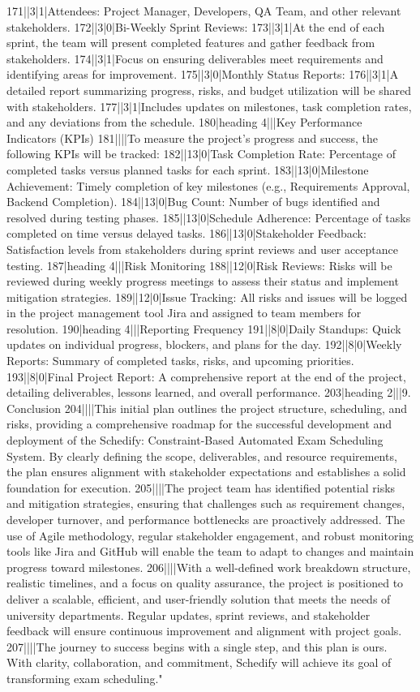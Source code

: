 171||3|1|Attendees: Project Manager, Developers, QA Team, and other relevant stakeholders.
172||3|0|Bi-Weekly Sprint Reviews:
173||3|1|At the end of each sprint, the team will present completed features and gather feedback from stakeholders.
174||3|1|Focus on ensuring deliverables meet requirements and identifying areas for improvement.
175||3|0|Monthly Status Reports:
176||3|1|A detailed report summarizing progress, risks, and budget utilization will be shared with stakeholders.
177||3|1|Includes updates on milestones, task completion rates, and any deviations from the schedule.
180|heading 4|||Key Performance Indicators (KPIs)
181||||To measure the project's progress and success, the following KPIs will be tracked:
182||13|0|Task Completion Rate: Percentage of completed tasks versus planned tasks for each sprint.
183||13|0|Milestone Achievement: Timely completion of key milestones (e.g., Requirements Approval, Backend Completion).
184||13|0|Bug Count: Number of bugs identified and resolved during testing phases.
185||13|0|Schedule Adherence: Percentage of tasks completed on time versus delayed tasks.
186||13|0|Stakeholder Feedback: Satisfaction levels from stakeholders during sprint reviews and user acceptance testing.
187|heading 4|||Risk Monitoring
188||12|0|Risk Reviews: Risks will be reviewed during weekly progress meetings to assess their status and implement mitigation strategies.
189||12|0|Issue Tracking: All risks and issues will be logged in the project management tool Jira and assigned to team members for resolution.
190|heading 4|||Reporting Frequency
191||8|0|Daily Standups: Quick updates on individual progress, blockers, and plans for the day.
192||8|0|Weekly Reports: Summary of completed tasks, risks, and upcoming priorities.
193||8|0|Final Project Report: A comprehensive report at the end of the project, detailing deliverables, lessons learned, and overall performance.
203|heading 2|||9. Conclusion
204||||This initial plan outlines the project structure, scheduling, and risks, providing a comprehensive roadmap for the successful development and deployment of the Schedify: Constraint-Based Automated Exam Scheduling System. By clearly defining the scope, deliverables, and resource requirements, the plan ensures alignment with stakeholder expectations and establishes a solid foundation for execution.
205||||The project team has identified potential risks and mitigation strategies, ensuring that challenges such as requirement changes, developer turnover, and performance bottlenecks are proactively addressed. The use of Agile methodology, regular stakeholder engagement, and robust monitoring tools like Jira and GitHub will enable the team to adapt to changes and maintain progress toward milestones.
206||||With a well-defined work breakdown structure, realistic timelines, and a focus on quality assurance, the project is positioned to deliver a scalable, efficient, and user-friendly solution that meets the needs of university departments. Regular updates, sprint reviews, and stakeholder feedback will ensure continuous improvement and alignment with project goals.
207||||The journey to success begins with a single step, and this plan is ours. With clarity, collaboration, and commitment, Schedify will achieve its goal of transforming exam scheduling."